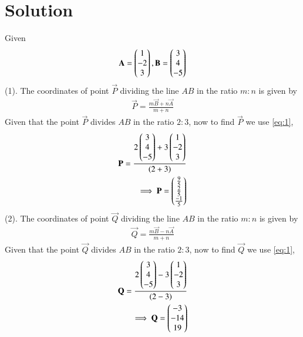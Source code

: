 \documentclass[journal,12pt,twocolumn]{IEEEtran}
\begin{document}
\section{Solution}
Given 
\begin{align}
  \mathbf{A} = \begin{pmatrix}1 \\ -2 \\ 3\end{pmatrix}, \mathbf{B}=\begin{pmatrix}3 \\ 4\\ -5\end{pmatrix} \label{eq:1}
\end{align}
(1). The coordinates of point $\vec{P}$ dividing the line $AB$ in the ratio $m:n$ is given by 
\begin{align}
\vec{P} = \frac{m\vec{B}+n\vec{A}}{m+n}  \label{2.0.2}
\end{align}
Given that the point $\vec{P}$ divides $AB$ in the ratio $2:3$, now to find $\vec{P}$ we use \eqref{eq:1},
\begin{align}
\mathbf{P}=\frac{2\begin{pmatrix}3\\4\\-5\end{pmatrix}+3\begin{pmatrix}1\\-2\\3\end{pmatrix}}
{(2+3)}
\\
\implies\mathbf{P}=\begin{pmatrix}{\frac{9}{5}} \\ {\frac{2}{5}} \\ {\frac{-1}{5}}\end{pmatrix}
\end{align}
(2). The coordinates of point $\vec{Q}$ dividing the line $AB$ in the ratio $m:n$ is given by 
\begin{align}
 \vec{Q} = \frac{m\vec{B}-n\vec{A}}{m+n}  \label{2.0.5}
\end{align}
Given that the point $\vec{Q}$ divides $AB$ in the ratio $2:3$, now to find $\vec{Q}$ we use \eqref{eq:1},
\begin{align}
\mathbf{Q}=\frac{2\begin{pmatrix}3\\4\\-5\end{pmatrix}-3\begin{pmatrix}1\\-2\\3\end{pmatrix}}
{(2-3)}
\\
\implies\mathbf{Q}=\begin{pmatrix}-3\\-14\\19\end{pmatrix}
\end{align}
\end{document}
